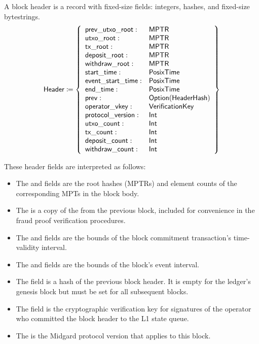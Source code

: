 \documentclass[../midgard.tex]{subfiles}
\begin{document}
A block header is a record with fixed-size fields: integers, hashes, and fixed-size bytestrings.
\begin{equation*}
    \mathsf{Header} \coloneq \left\{
    \begin{array}{ll}
        \mathsf{prev\_utxo\_root} : & \mathsf{MPTR} \\
        \mathsf{utxo\_root} : & \mathsf{MPTR} \\
        \mathsf{tx\_root} : & \mathsf{MPTR} \\
        \mathsf{deposit\_root} : & \mathsf{MPTR} \\
        \mathsf{withdraw\_root} : & \mathsf{MPTR} \\
        \mathsf{start\_time} : & \mathsf{PosixTime} \\
        \mathsf{event\_start\_time} : & \mathsf{PosixTime} \\
        \mathsf{end\_time} : & \mathsf{PosixTime} \\
        \mathsf{prev} : & \mathsf{Option(HeaderHash)} \\
        \mathsf{operator\_vkey} : & \mathsf{VerificationKey} \\
        \mathsf{protocol\_version} : & \mathsf{Int} \\
        \mathsf{utxo\_count} : & \mathsf{Int} \\
        \mathsf{tx\_count} : & \mathsf{Int} \\
        \mathsf{deposit\_count} : & \mathsf{Int} \\
        \mathsf{withdraw\_count} : & \mathsf{Int}
    \end{array} \right\}
\end{equation*}

These header fields are interpreted as follows:
\begin{itemize}
    \item The  and  fields are the root hashes (MPTRs) and element counts of the corresponding MPTs in the block body.
    \item The  is a copy of the  from the previous block, included for convenience in the fraud proof verification procedures.
    \item The  and  fields are the bounds of the block commitment transaction's time-validity interval.
    \item The  and  fields are the bounds of the block's event interval.
    \item The  field is a hash of the previous block header. It is empty for the ledger's genesis block but must be set for all subsequent blocks.
    \item The  field is the cryptographic verification key for signatures of the operator who committed the block header to the L1 state queue.
    \item The  is the Midgard protocol version that applies to this block.
\end{itemize}
\end{document}
